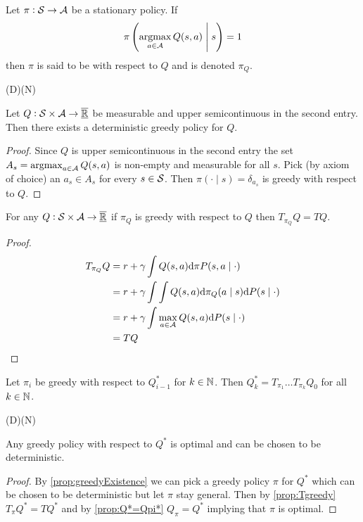 \begin{defn}
  Let $\pi : \mathcal{S} \to \mathcal{A}$ be a stationary policy. If
  \[ \pi \left(\operatorname*{argmax}_{a \in \mathcal{A}} Q(s, a) \;\middle\vert\; s \right) = 1 \]
  then $\pi$ is said to be  with respect to $Q$ and is
  denoted $\pi_Q$.
\end{defn}

\begin{prop} (D)(N)

  Let $Q:\mathcal{S} \times \mathcal{A} \to \overline{\underline{\mathbb{R}}}$ be measurable
  and upper semicontinuous in the second entry.
  Then there exists a deterministic greedy policy for $Q$.
  \label{prop:greedyExistence}
\end{prop}
\begin{proof}
  Since $Q$ is upper semicontinuous in the second entry
  the set $A_s = \operatorname*{argmax}_{a \in \mathcal{A}} Q(s, a)$ is non-empty
  and measurable for all $s$.
  Pick (by axiom of choice) an $a_s \in A_s$ for every $s \in \mathcal{S}$.
  Then $\pi(\cdot \mid s) = \delta_{a_s}$ is greedy with respect to $Q$.
\end{proof}

\begin{prop}
  For any $Q : \mathcal{S} \times \mathcal{A} \to \overline{\underline{\mathbb{R}}}$ if $\pi_Q$ is greedy
  with respect to $Q$ then $T_{\pi_Q} Q = TQ$.
  \label{prop:Tgreedy}
\end{prop}
\begin{proof}
  \begin{align*}
    T_{\pi_Q} Q &= r + \gamma \int Q(s, a) \mathrm{d} \pi P(s, a \mid \cdot)
    \\ &= r + \gamma \int \int Q(s, a)
    \mathrm{d} \pi_Q(a \mid s) \mathrm{d} P(s \mid \cdot)
    \\ &= r + \gamma \int \max_{a \in \mathcal{A}} Q(s, a)
    \mathrm{d} P(s \mid \cdot)
    \\ &= T Q
  \end{align*}
\end{proof}

\begin{prop}
  Let $\pi_i$ be greedy with respect to $Q_{i-1}^*$ for $k \in \mathbb{N}$.
  Then $Q^*_k = T_{\pi_1} \dots T_{\pi_k} Q_0$ for all $k \in \mathbb{N}$.
  \label{prop:greedyOptFinite}
\end{prop}

\begin{prop}(D)(N)

  Any greedy policy with respect to $Q^*$ is
  optimal and can be chosen to be deterministic.
\end{prop}
\begin{proof}
  By \cref{prop:greedyExistence} we can pick a greedy policy $\pi$ for $Q^*$
  which can be chosen to be deterministic but let $\pi$ stay general.
  Then by \cref{prop:Tgreedy} $T_\pi Q^* = T Q^*$
  and by \cref{prop:Q*=Qpi*} $Q_\pi = Q^*$ implying that $\pi$ is optimal.
\end{proof}

